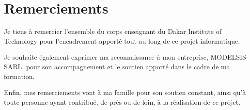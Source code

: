 \chapter*{Remerciements}

Je tiens à remercier l'ensemble du corps enseignant du Dakar Institute of Technology pour
l'encadrement apporté tout au long de ce projet informatique.

Je souhaite également exprimer ma reconnaissance à mon entreprise, MODELSIS SARL, pour son
accompagnement et le soutien apporté dans le cadre de ma formation.

Enfin, mes remerciements vont à ma famille pour son soutien constant, ainsi qu'à toute personne
ayant contribué, de près ou de loin, à la réalisation de ce projet.

